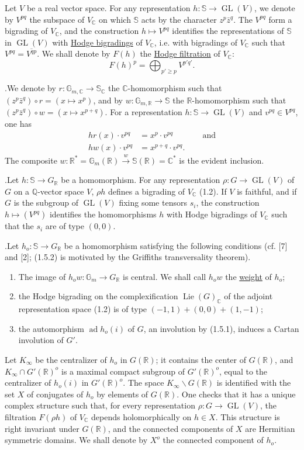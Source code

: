 \documentclass[10pt]{article}
\newcommand{\C}{\mathbb C}
\newcommand{\Gm}{\mathbb G_m}
\newcommand{\Q}{\mathbb Q}
\newcommand{\R}{\mathbb R}
\newcommand{\bS}{\mathbb S}
\newcommand{\GL}{\operatorname{GL}}
\newcommand{\Lie}{\operatorname{Lie}}
\newcommand{\ad}{\operatorname{ad}}
\begin{document}
Let $V$ be a real vector space. For any representation $h:\bS\to\GL(V)$, we denote by $V^{pq}$ the subspace of $V_\C$ on which $\bS$ acts by the character $z^p\bar z^q$. The $V^{pq}$ form a bigrading of $V_\C$, and the construction $h\mapsto V^{pq}$ identifies the representations of $\bS$ in $\GL(V)$ with \uline{Hodge bigradings} of $V_\C$, i.e. with bigradings of $V_\C$ such that $V^{pq}=\overline{V^{qp}}$. We shall denote by $F(h)$ the \uline{Hodge filtration} of $V_\C$:
\[
F(h)^p=\bigoplus_{p'\ge p}V^{p'q'}.
\]

.\quad We denote by $r:\mathbb G_{m,\C}\to\bS_\C$ the $\C$-homomorphism such that $(z^p\bar z^q)\circ r=(x\longmapsto x^p)$, and by $w:\mathbb G_{m,\R}\to\bS$ the $\R$-homomorphism such that $(z^p\bar z^q)\circ w=(x\longmapsto x^{p+q})$. For a representation $h:\bS\to\GL(V)$ and $v^{pq}\in V^{pq}$, one has
\[
\begin{aligned}
hr(x)\cdot v^{pq}&=x^p\cdot v^{pq}\qquad &&\text{and}\\
hw(x)\cdot v^{pq}&=x^{p+q}\cdot v^{pq}.
\end{aligned}
\]
The composite $w:\R^*=\mathbb G_m(\R)\xrightarrow{w}\bS(\R)=\C^*$ is the evident inclusion.

.\quad Let $h:\bS\to G_\R$ be a homomorphism. For any representation $\rho:G\to\GL(V)$ of $G$ on a $\Q$-vector space $V$, $\rho h$ defines a bigrading of $V_\C$ (1.2). If $V$ is faithful, and if $G$ is the subgroup of $\GL(V)$ fixing some tensors $s_i$, the construction $h\mapsto(V^{pq})$ identifies the homomorphisms $h$ with Hodge bigradings of $V_\C$ such that the $s_i$ are of type $(0,0)$.

.\quad Let $h_o:\bS\to G_\R$ be a homomorphism satisfying the following conditions (cf. [7] and [2]; (1.5.2) is motivated by the Griffiths transversality theorem).

\begin{enumerate}[label={(1.5.\arabic*)},leftmargin=3.0em]
\item The image of $h_ow:\Gm\to G_\R$ is central. We shall call $h_ow$ the \uline{weight} of $h_o$;
\item the Hodge bigrading on the complexification $\Lie(G)_\C$ of the adjoint representation space (1.2) is of type $(-1,1)+(0,0)+(1,-1)$;
\item the automorphism $\ad h_o(i)$ of $G$, an involution by (1.5.1), induces a Cartan involution of $G'$.
\end{enumerate}

Let $K_\infty$ be the centralizer of $h_o$ in $G(\R)$; it contains the center of $G(\R)$, and $K_\infty\cap G'(\R)^o$ is a maximal compact subgroup of $G'(\R)^o$, equal to the centralizer of $h_o(i)$ in $G'(\R)^o$. The space $K_\infty\backslash G(\R)$ is identified with the set $X$ of conjugates of $h_o$ by elements of $G(\R)$. One checks that it has a unique complex structure such that, for every representation $\rho:G\to\GL(V)$, the filtration $F(\rho h)$ of $V_\C$ depends holomorphically on $h\in X$. This structure is right invariant under $G(\R)$, and the connected components of $X$ are Hermitian symmetric domains. We shall denote by $X^o$ the connected component of $h_o$.
\end{document}
